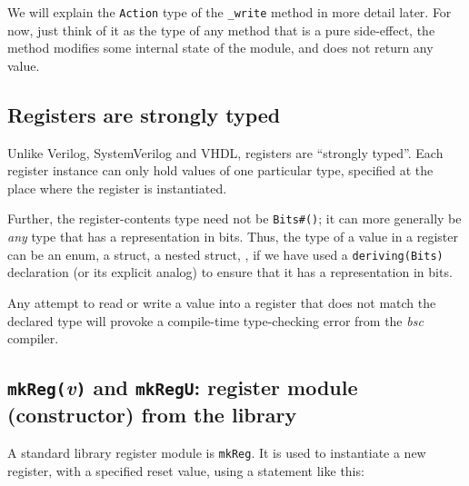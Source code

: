 
We will explain the {\tt Action} type of the {\tt \_write} method in
more detail later.  For now, just think of it as the type of any
method that is a pure side-effect, {\ie} the method modifies some
internal state of the module, and does not return any value.


\subsection{Registers are strongly typed}


Unlike Verilog, SystemVerilog and VHDL, {\BSV} registers are ``strongly
typed''.  Each register instance can only hold values of one
particular type, specified at the place where the register is
instantiated.

Further, the register-contents type need not be \verb|Bits#()|; it can
more generally be \emph{any} {\BSV} type that has a representation in
bits.  Thus, the type of a value in a register can be an enum, a
struct, a nested struct, {\etc}, if we have used a
\verb|deriving(Bits)| declaration (or its explicit analog) to ensure
that it has a representation in bits.

Any attempt to read or write a value into a register that does not
match the declared type will provoke a compile-time type-checking
error from the \emph{bsc} compiler.


\subsection{{\tt mkReg(}\emph{v}{\tt )} and {\tt mkRegU}: register module (constructor) from the {\BSV} library}




A standard {\BSV} library register module is \verb|mkReg|.  It is used to
instantiate a new register, with a specified reset value, using a
statement like this:

